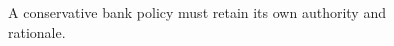 \begin{figure}[H]
\centering
{}
\caption{A conservative bank policy must retain its own authority and rationale.}\label{fig:teach-M10-02}
\end{figure}

